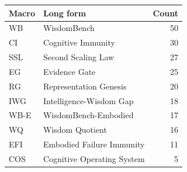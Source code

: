 \begin{tabular}{llr}
\toprule
Macro & Long form & Count \\
\midrule
WB & WisdomBench & 50 \\
CI & Cognitive Immunity & 30 \\
SSL & Second Scaling Law & 27 \\
EG & Evidence Gate & 25 \\
RG & Representation Genesis & 20 \\
IWG & Intelligence-Wisdom Gap & 18 \\
WB-E & WisdomBench-Embodied & 17 \\
WQ & Wisdom Quotient & 16 \\
EFI & Embodied Failure Immunity & 11 \\
COS & Cognitive Operating System & 5 \\
\bottomrule
\end{tabular}
